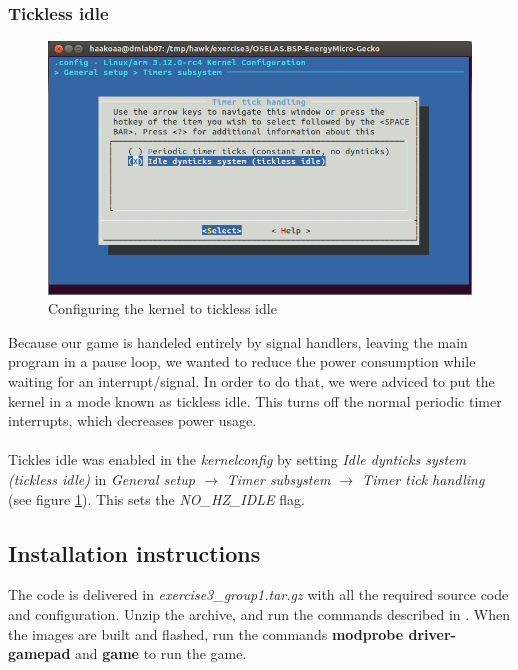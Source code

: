 \subsubsection{Tickless idle}
\begin{figure}[h]
	\centering
	\includegraphics[width=12cm]{img/tickless.png}
	\caption{Configuring the kernel to tickless idle}
	\label{fig:tickless}
\end{figure}
Because our game is handeled entirely by signal handlers, leaving the main program in a pause loop, we wanted to reduce the power consumption while waiting for an interrupt/signal. In order to do that, we were adviced to put the kernel in a mode known as tickless idle. This turns off the normal periodic timer interrupts, which decreases power usage.\\
\\
Tickles idle was enabled in the \emph{kernelconfig} by setting \emph{Idle dynticks system (tickless idle)} in \emph{General setup $\rightarrow$ Timer subsystem $\rightarrow$ Timer tick handling} (see figure \ref{fig:tickless}). This sets the \emph{NO\_HZ\_IDLE} flag.

\subsection{Installation instructions}
The code is delivered in \emph{exercise3\_group1.tar.gz} with all the required source code and configuration. Unzip the archive, and run the commands described in \cite{compendium}. When the images are built and flashed, run the commands \textbf{modprobe driver-gamepad} and \textbf{game} to run the game.


